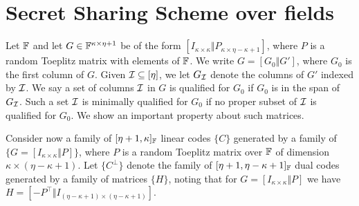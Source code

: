 \section{Secret Sharing Scheme over fields}
Let ${\mathbb F}$ and let $G \in {\mathbb F}^{\kappa \times \eta+1}$ be of the form $[I_{\kappa \times \kappa}\Vert P_{\kappa \times \eta - \kappa + 1}]$, where $P$ is a random Toeplitz matrix with elements of ${\mathbb F}$.
We write $G = [G_0\Vert G']$, where $G_0$ is the first column of $G$.
Given ${\mathcal I} \subseteq [\eta]$, we let $G_{\mathcal I}$ denote the columns of $G'$ indexed by ${\mathcal I}$.
We say a set of columns ${\mathcal I}$ in $G$ is qualified for $G_0$ if $G_0$ is in the span of $G_{\mathcal I}$.
Such a set ${\mathcal I}$ is minimally qualified for $G_0$ if no proper subset of ${\mathcal I}$ is qualified for $G_0$.
We show an important property about such matrices.


Consider now a family of $[\eta + 1, \kappa]_{\mathbb F}$ linear codes $\{C\}$ generated by a family of $\{ G = [I_{\kappa \times \kappa}\Vert P] \}$, where $P$ is a random Toeplitz matrix over ${\mathbb F}$ of dimension $\kappa \times (\eta - \kappa + 1)$.
Let $\{C^\perp\}$ denote the family of $[\eta + 1, \eta - \kappa + 1]_{\mathbb F}$ dual codes generated by a family of matrices $\{H\}$, noting that for $G = [I_{\kappa \times \kappa}\Vert P]$ we have $H = [-P^\top \Vert I_{(\eta-\kappa + 1)\times (\eta-\kappa+1)}]$.



